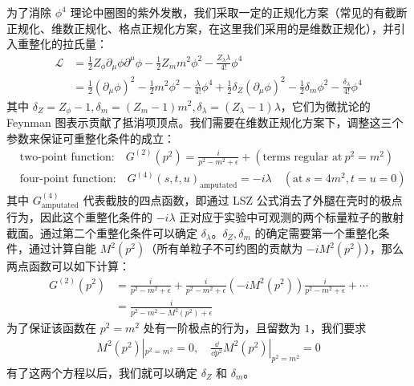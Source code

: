 为了消除 $\phi^4$ 理论中圈图的紫外发散，我们采取一定的正规化方案（常见的有截断正规化、维数正规化、格点正规化方案，在这里我们采用的是维数正规化），并引入重整化的拉氏量：
\begin{equation}
\begin{aligned}
\mathcal{L}
&=\frac{1}{2}Z_\phi \partial_\mu \phi \partial^\mu \phi - \frac{1}{2} Z_m m^2\phi^2 - \frac{Z_\lambda \lambda}{4!}\phi^4\\
&=\frac{1}{2}(\partial_\mu\phi)^2 - \frac{1}{2}m^2\phi^2 - \frac{\lambda}{4!}\phi^4+\frac{1}{2}\delta_Z (\partial_\mu \phi)^2 - \frac{1}{2}\delta_m \phi^2 - \frac{\delta_\lambda}{4!}\phi^4
\end{aligned}
\end{equation}
其中 $\delta_Z=Z_\phi-1,\delta_m = (Z_m-1)m^2,\delta_\lambda = (Z_\lambda-1)\lambda$，它们为微扰论的 Feynman 图表示贡献了抵消项顶点。我们需要在维数正规化方案下，调整这三个参数来保证可重整化条件的成立：
\begin{equation}
\begin{aligned}
&\text{two-point function:}\quad G^{(2)}(p^2)=\frac{i}{p^2-m^2+\epsilon}+(\text{terms regular at}\ p^2=m^2)\\
&\text{four-point function:}\quad G^{(4)}(s,t,u)_\text{amputated}=-i\lambda\quad (\text{at}\ s=4m^2,t=u=0)
\end{aligned}
\end{equation}
其中 $G^{(4)}_\text{amputated}$ 代表截肢的四点函数，即通过 LSZ 公式消去了外腿在壳时的极点行为，因此这个重整化条件的 $-i\lambda$ 正对应于实验中可观测的两个标量粒子的散射截面。通过第二个重整化条件可以确定 $\delta_\lambda$。$\delta_Z,\delta_m$ 的确定需要第一个重整化条件，通过计算自能 $M^2(p^2)$（所有单粒子不可约图的贡献为 $-iM^2(p^2)$），那么两点函数可以如下计算：
\begin{equation}
\begin{aligned}
G^{(2)}(p^2)&=\frac{i}{p^2-m^2+\epsilon}+\frac{i}{p^2-m^2+\epsilon} (-iM^2(p^2))\frac{i}{p^2-m^2+\epsilon}+\cdots\\
&=\frac{i}{p^2-m^2-M^2(p^2)+\epsilon}
\end{aligned}
\end{equation}
为了保证该函数在 $p^2=m^2$ 处有一阶极点的行为，且留数为 $1$，我们要求
\begin{equation}
\begin{aligned}
M^2(p^2)|_{p^2=m^2}=0,\quad \frac{\dd }{\dd p^2} M^2(p^2) |_{p^2=m^2}=0
\end{aligned}
\end{equation}
有了这两个方程以后，我们就可以确定 $\delta_Z$ 和 $\delta_m$。

